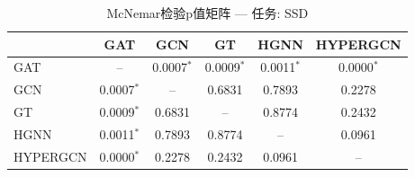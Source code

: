 \begin{table}[htbp]
\centering
\caption{McNemar检验p值矩阵 — 任务: SSD}
\label{tab:mcnemar_SSD}
\begin{tabular}{lccccc}
\toprule
 & GAT & GCN & GT & HGNN & HYPERGCN \\
\midrule
GAT & -- & 0.0007$^*$ & 0.0009$^*$ & 0.0011$^*$ & 0.0000$^*$ \\
GCN & 0.0007$^*$ & -- & 0.6831 & 0.7893 & 0.2278 \\
GT & 0.0009$^*$ & 0.6831 & -- & 0.8774 & 0.2432 \\
HGNN & 0.0011$^*$ & 0.7893 & 0.8774 & -- & 0.0961 \\
HYPERGCN & 0.0000$^*$ & 0.2278 & 0.2432 & 0.0961 & -- \\
\bottomrule
\end{tabular}
\end{table}